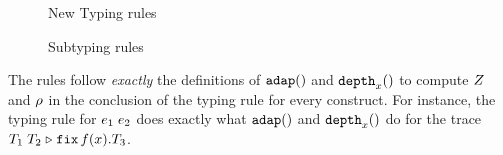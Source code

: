 \documentclass[a4paper,11pt]{article}
\theoremstyle{definition}
\begin{document}
\begin{figure}

  \caption{New Typing rules}
  \label{fig:new-type-rules}
\end{figure}

\begin{figure}
 \caption{Subtyping rules}
  \label{fig:sub-type-rules}
\end{figure}


The rules follow \emph{exactly} the definitions of $\mathtt{adap}()$ and
$\mathtt{depth}_{x}()$ to compute $Z$ and $\rho$ in the conclusion of the
typing rule for every construct. For instance, the typing rule for
$e_1 \; e_2$ does exactly what $\mathtt{adap}()$ and $\mathtt{depth}_{x}()$
do for the trace $T_1 \; T_2 \mathrel{\triangleright} {\mathop{\mathtt{fix}} f(x).T_3}$.
\end{document}
